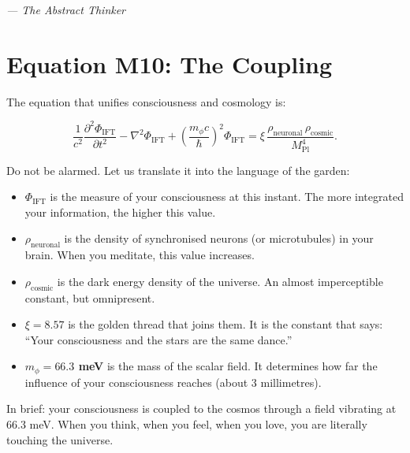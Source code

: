 \documentclass[12pt,a4paper,openany]{book}
\begin{document}
\begin{center}
\itshape
--- The Abstract Thinker
\end{center}
\newpage

\chapter{Equation M10: The Coupling}
\label{chap:M10}

The equation that unifies consciousness and cosmology is:

\begin{equation}
\boxed{
\frac{1}{c^2}\frac{\partial^2 \Phi_{\text{IFT}}}{\partial t^2} - \nabla^2 \Phi_{\text{IFT}} + \left(\frac{m_\phi c}{\hbar}\right)^2 \Phi_{\text{IFT}} = \xi \, \frac{\rho_{\text{neuronal}} \, \rho_{\text{cosmic}}}{M_{\text{Pl}}^4}
}.
\end{equation}

Do not be alarmed. Let us translate it into the language of the garden:

\begin{itemize}
\item \textbf{$\Phi_{\text{IFT}}$} is the measure of your consciousness at this instant. The more integrated your information, the higher this value.
\item \textbf{$\rho_{\text{neuronal}}$} is the density of synchronised neurons (or microtubules) in your brain. When you meditate, this value increases.
\item \textbf{$\rho_{\text{cosmic}}$} is the dark energy density of the universe. An almost imperceptible constant, but omnipresent.
\item \textbf{$\xi = 8.57$} is the golden thread that joins them. It is the constant that says: ``Your consciousness and the stars are the same dance.''
\item \textbf{$m_\phi = 66.3$ meV} is the mass of the scalar field. It determines how far the influence of your consciousness reaches (about 3 millimetres).
\end{itemize}

In brief: your consciousness is coupled to the cosmos through a field vibrating at 66.3 meV. When you think, when you feel, when you love, you are literally touching the universe.

\vspace{1cm}
\end{document}
